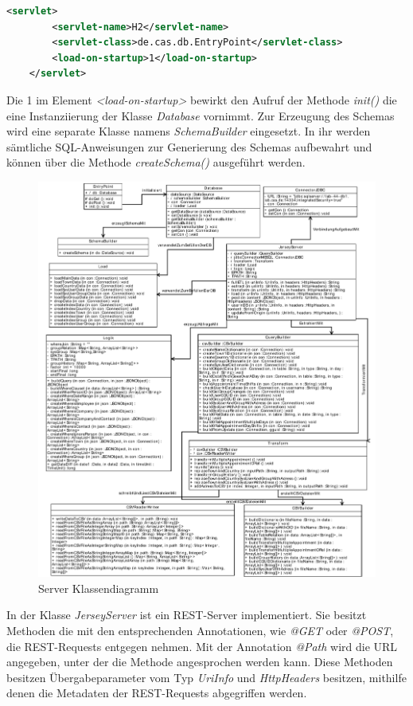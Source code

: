 \begin{lstlisting}[language=XML]
	<servlet>
		<servlet-name>H2</servlet-name>
		<servlet-class>de.cas.db.EntryPoint</servlet-class>
		<load-on-startup>1</load-on-startup>
	</servlet>
\end{lstlisting}

Die 1 im Element \textit{<load-on-startup>} bewirkt den Aufruf der Methode \textit{init()} die eine Instanziierung der Klasse \textit{Database} vornimmt. Zur Erzeugung des Schemas wird eine separate Klasse namens \textit{SchemaBuilder} eingesetzt. In ihr werden sämtliche SQL-Anweisungen zur Generierung des Schemas aufbewahrt und können über die Methode \textit{createSchema()} ausgeführt werden.

\begin{figure}[htbp]
\begin{center}
\includegraphics[width=1.0\textwidth]{pics/ServerKlassendiagramm.pdf}
\caption{Server Klassendiagramm}
\label{umsetzung_klassendiagramm_server}
\end{center}
\end{figure}

In der Klasse \textit{JerseyServer} ist ein REST-Server implementiert. Sie besitzt Methoden die mit den entsprechenden Annotationen, wie \textit{@GET} oder \textit{@POST}, die REST-Requests entgegen nehmen. Mit der Annotation \textit{@Path} wird die URL angegeben, unter der die Methode angesprochen werden kann. Diese Methoden besitzen Übergabeparameter vom Typ \textit{UriInfo} und \textit{HttpHeaders} besitzen, mithilfe denen die Metadaten der REST-Requests abgegriffen werden. 

